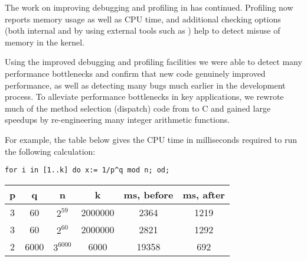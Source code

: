 The work on improving debugging and profiling in \GAP has
continued. Profiling now reports memory usage as well as CPU time, and
additional checking options (both internal and by using external tools such as
\href{http://www.valgrind.org/}{}) help to detect misuse of memory in the kernel.

Using the improved debugging and profiling facilities we were able to
detect many performance bottlenecks and confirm that new code
genuinely improved performance, as well as detecting many bugs much
earlier in the development process. To alleviate performance
bottlenecks in key applications, we rewrote much of the method
selection (dispatch) code from \GAP to C and gained large speedups by
re-engineering many integer arithmetic functions.

For example, the table below gives the CPU time in milliseconds required
to run the following calculation:

\begin{verbatim}
for i in [1..k] do x:= 1/p^q mod n; od;
\end{verbatim}
\medbreak
\begin{center}
\begin{tabular}{| c | c | c | c | c | c |} 
\hline
p & q    & n          & k        & ms, before & ms, after \\
\hline
3 & 60   & $2^{59}$   & 2000000  & 2364       & 1219 \\
3 & 60   & $2^{60}$   & 2000000  & 2821       & 1292 \\
2 & 6000 & $3^{6000}$ & 6000     & 19358      & 692  \\
\hline
\end{tabular}
\end{center}

%
%

%
%

